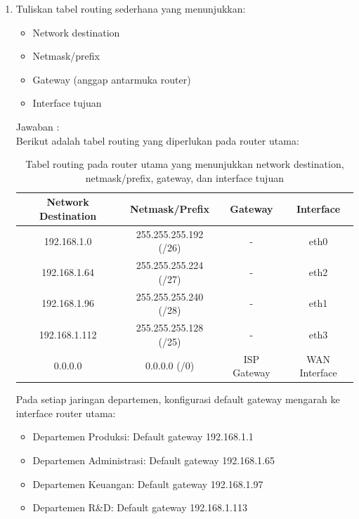 \begin{enumerate}
	\item Tuliskan tabel routing sederhana yang menunjukkan:
    \begin{itemize}
        \item Network destination
        \item Netmask/prefix
        \item Gateway (anggap antarmuka router)
        \item Interface tujuan
    \end{itemize}
    Jawaban :
    \\Berikut adalah tabel routing yang diperlukan pada router utama:
    \begin{table}[H]
    \centering
    \begin{tabular}{|c|c|c|c|}
      \hline
      Network Destination & Netmask/Prefix & Gateway & Interface \\
      \hline
      192.168.1.0 & 255.255.255.192 (/26) & - & eth0 \\
      192.168.1.64 & 255.255.255.224 (/27) & - & eth2 \\
      192.168.1.96 & 255.255.255.240 (/28) & - & eth1 \\
      192.168.1.112 & 255.255.255.128 (/25) & - & eth3 \\
      0.0.0.0 & 0.0.0.0 (/0) & ISP Gateway & WAN Interface \\
      \hline
    \end{tabular}
    \caption{Tabel routing pada router utama yang menunjukkan network destination, netmask/prefix, gateway, dan interface tujuan}
    \end{table}
    Pada setiap jaringan departemen, konfigurasi default gateway mengarah ke interface router utama:
    \begin{itemize}
        \item Departemen Produksi: Default gateway 192.168.1.1
        \item Departemen Administrasi: Default gateway 192.168.1.65
        \item Departemen Keuangan: Default gateway 192.168.1.97
        \item Departemen R&D: Default gateway 192.168.1.113
    \end{itemize}


\end{enumerate}
